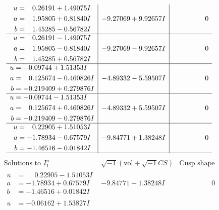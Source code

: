 \documentclass[1p]{elsarticle_modified}
\theoremstyle{definition}
\newcommand{\I}{\sqrt{-1}}
\begin{document}
$$\begin{array}{c|c|c}
\begin{aligned}
u &= \phantom{-}0.26191 + 1.49075 I \\
a &= \phantom{-}1.95805 + 0.81840 I \\
b &= \phantom{-}1.45285 - 0.56782 I\end{aligned}
 & -9.27069 + 9.92657 I & \phantom{-0.000000 } 0 \\ \hline\begin{aligned}
u &= \phantom{-}0.26191 - 1.49075 I \\
a &= \phantom{-}1.95805 - 0.81840 I \\
b &= \phantom{-}1.45285 + 0.56782 I\end{aligned}
 & -9.27069 - 9.92657 I & \phantom{-0.000000 } 0 \\ \hline\begin{aligned}
u &= -0.09744 + 1.51353 I \\
a &= \phantom{-}0.125674 - 0.460826 I \\
b &= -0.219409 + 0.279876 I\end{aligned}
 & -4.89332 - 5.59507 I & \phantom{-0.000000 } 0 \\ \hline\begin{aligned}
u &= -0.09744 - 1.51353 I \\
a &= \phantom{-}0.125674 + 0.460826 I \\
b &= -0.219409 - 0.279876 I\end{aligned}
 & -4.89332 + 5.59507 I & \phantom{-0.000000 } 0 \\ \hline\begin{aligned}
u &= \phantom{-}0.22905 + 1.51053 I \\
a &= -1.78934 - 0.67579 I \\
b &= -1.46516 - 0.01842 I\end{aligned}
 & -9.84771 + 1.38248 I & \phantom{-0.000000 } 0\\
 \hline 
 \end{array}$$\newpage$$\begin{array}{c|c|c}  
\text{Solutions to }I^u_{1}& \I (\text{vol} + \sqrt{-1}CS) & \text{Cusp shape}\\
 \hline 
\begin{aligned}
u &= \phantom{-}0.22905 - 1.51053 I \\
a &= -1.78934 + 0.67579 I \\
b &= -1.46516 + 0.01842 I\end{aligned}
 & -9.84771 - 1.38248 I & \phantom{-0.000000 } 0 \\ \hline\begin{aligned}
u &= -0.06162 + 1.53827 I \\

\end{aligned}
\end{array}$$
\end{document}
